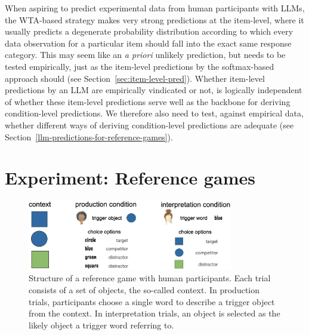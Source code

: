 \documentclass[fleqn]{article}
\begin{document}
When aspiring to predict experimental data from human participants with LLMs, the WTA-based strategy makes very strong predictions at the item-level, where it usually predicts a degenerate probability distribution according to which every data observation for a particular item should fall into the exact same response category.
This may seem like an \emph{a priori} unlikely prediction, but needs to be tested empirically, just as the item-level predictions by the softmax-based approach should (see Section~\ref{sec:item-level-pred}).
Whether item-level predictions by an LLM are empirically vindicated or not, is logically independent of whether these item-level predictions serve well as the backbone for deriving condition-level predictions.
We therefore also need to test, against empirical data, whether different ways of deriving condition-level predictions are adequate (see Section~\ref{llm-predictions-for-reference-games}).

\section{Experiment: Reference games}
\label{experiment-reference-games}

\begin{figure}
  \centering

  \includegraphics[width = 0.8\textwidth]{00-pics/reference-game.png}

  \caption{Structure of a reference game with human participants. Each trial consists of a set of objects, the so-called context. In production trials, participants choose a single word to describe a trigger object from the context. In interpretation trials, an object is selected as the likely object a trigger word referring to.}
  \label{fig:ref-game}
\end{figure}
\end{document}

